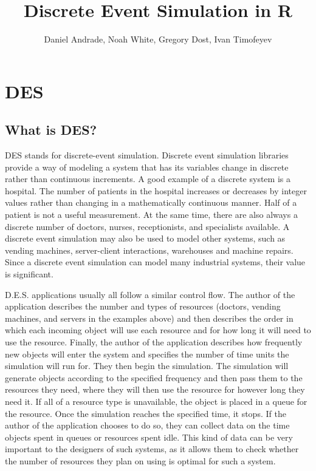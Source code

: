 \documentclass[a4paper]{article}
\title{Discrete Event Simulation in R}
\author{Daniel Andrade, Noah White, Gregory Dost, Ivan Timofeyev}
\begin{document}
\maketitle

\newpage
\tableofcontents

\newpage

\section{DES}




\subsection{What is DES?}

\par DES stands for discrete-event simulation. Discrete event simulation libraries provide a way of modeling a system that has its variables change in discrete rather than continuous increments. A good example of a discrete system is a hospital. The number of patients in the hospital increases or decreases by integer values rather than changing in a mathematically continuous manner. Half of a patient is not a useful measurement. At the same time, there are also always a discrete number of doctors, nurses, receptionists, and specialists available. A discrete event simulation may also be used to model other systems, such as vending machines, server-client interactions, warehouses and machine repairs. Since a discrete event simulation can model many industrial systems, their value is significant.
	\\
    \par D.E.S. applications usually all follow a similar control flow. The author of the application describes the number and types of resources (doctors, vending machines, and servers in the examples above) and then describes the order in which each incoming object will use each resource and for how long it will need to use the resource. Finally, the author of the application describes how frequently new objects will enter the system and specifies the number of time units the simulation will run for. They then begin the simulation. The simulation will generate objects according to the specified frequency and then pass them to the resources they need, where they will then use the resource for however long they need it. If all of a resource type is unavailable, the object is placed in a queue for the resource. Once the simulation reaches the specified time, it stops. If the author of the application chooses to do so, they can collect data on the time objects spent in queues or resources spent idle. This kind of data can be very important to the designers of such systems, as it allows them to check whether the number of resources they plan on using is optimal for such a system.
\end{document}
